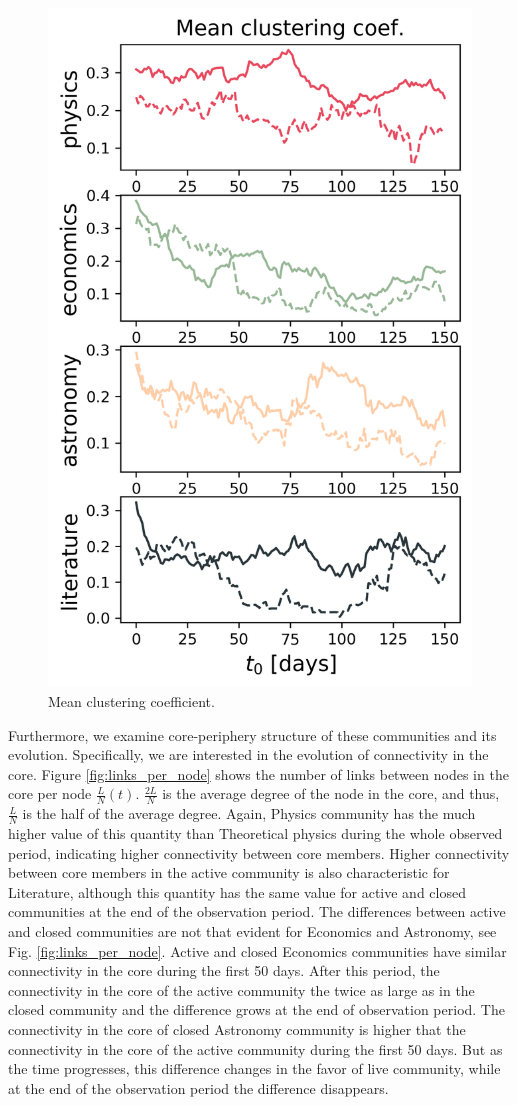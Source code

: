 \begin{figure}
	\centering
	\includegraphics[width=0.5\linewidth]{Figures/Mean_clustering_coef.png}
	\caption{Mean clustering coefficient.}
	\label{fig:clustering}
\end{figure}
Furthermore, we examine core-periphery structure of these communities and its evolution. Specifically, we are interested in the evolution of connectivity in the core. Figure \ref{fig:links_per_node} shows the number of links between nodes in the core per node $\frac{L}{N}(t)$. $\frac{2L}{N}$ is the average degree of the node in the core, and thus, $\frac{L}{N}$ is the half of the average degree. Again, Physics community has the much higher value of this quantity than Theoretical physics during the whole observed period, indicating higher connectivity between core members. Higher connectivity between core members in the active community is also characteristic for Literature, although this quantity has the same value for active and closed communities at the end of the observation period. The differences between active and closed communities are not that evident for Economics and Astronomy, see Fig. \ref{fig:links_per_node}. Active and closed Economics communities have similar connectivity in the core during the first 50 days. After this period, the connectivity in the core of the active community the twice as large as in the closed community and the difference grows at the end of observation period. The connectivity in the core of closed Astronomy community is higher that the connectivity in the core of the active community during the first 50 days. But as the time progresses, this difference changes in the favor of live community, while at the end of the observation period the difference disappears.

